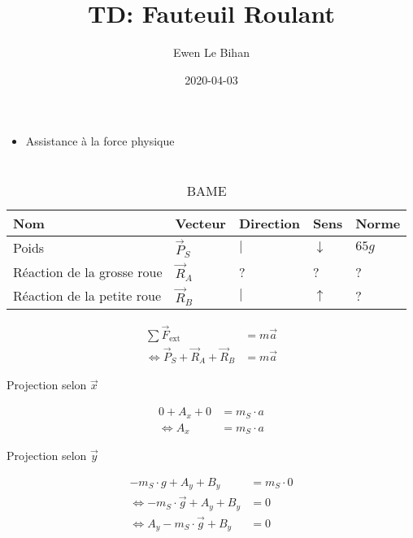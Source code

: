 \documentclass{article}
\title{TD: Fauteuil Roulant}
\author{Ewen Le Bihan}
\date{2020-04-03}
\begin{document}
\maketitle

\section{}

\begin{itemize}
  \item Assistance à la force physique 
\end{itemize}

\section{}

\begin{table}[H]
  \centering
  \begin{tabular}{lllll}
    Nom & Vecteur & Direction & Sens & Norme \\\hline
    Poids & $\vec P_S$ & $\vert$ & $\downarrow$ & $65g$ \\
    Réaction de la grosse roue & $\vec R_A$ & ? & ? & ? \\
    Réaction de la petite roue & $\vec R_B$ & $\vert$ & $\uparrow$ & ?
  \end{tabular}
  \caption{BAME}
  \label{tab:bame}
\end{table}

\begin{equation*}
  \begin{split}
    \sum \vec F_\text{ext} &= m\vec a \\
    \iff \vec P_S + \vec R_A + \vec R_B &= m\vec a
  \end{split}
\end{equation*}

Projection selon $\vec x$

\begin{equation*}
  \begin{split}
    0 + A_x + 0 &= m_S \cdot a \\
    \iff A_x &= m_S \cdot a
  \end{split}
\end{equation*}

Projection selon $\vec y$

\begin{equation*}
  \begin{split}
    -m_S \cdot g + A_y + B_y &= m_S \cdot 0 \\
    \iff -m_S \cdot \vec g + A_y + B_y &= 0 \\
    \iff A_y - m_S \cdot \vec g + B_y &= 0
  \end{split}
\end{equation*}
\end{document}
